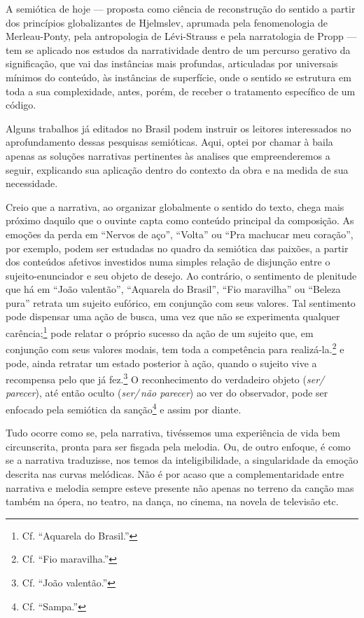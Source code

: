 A semiótica de hoje ---
proposta como ciência de reconstrução do sentido a partir dos princípios
globalizantes de Hjelmslev, aprumada pela fenomenologia de
Merleau-Ponty, pela antropologia de Lévi-Strauss e pela narratologia de
Propp --- tem se aplicado nos estudos da narratividade dentro de um
percurso gerativo da significação, que vai das instâncias mais profundas, articuladas por universais mínimos do conteúdo, às instâncias de
superfície, onde o sentido se estrutura em toda a sua complexidade,
antes, porém, de receber o tratamento específico de um código.

Alguns trabalhos já editados no Brasil podem instruir os leitores
interessados no aprofundamento dessas pesquisas semióticas. Aqui,
optei por chamar à baila apenas as soluções narrativas pertinentes às
analises que empreenderemos a seguir, explicando sua aplicação dentro do
contexto da obra e na medida de sua necessidade.

Creio que a narrativa, ao organizar globalmente o sentido do texto,
chega mais próximo daquilo que o ouvinte capta como conteúdo principal
da composição. As emoções da perda em ``Nervos de aço'', ``Volta'' ou ``Pra
machucar meu coração'', por exemplo, podem ser estudadas no quadro da
semiótica das paixões, a partir dos conteúdos afetivos investidos numa
simples relação de disjunção entre o sujeito-enunciador e seu objeto de
desejo. Ao contrário, o sentimento de plenitude que há em ``João valentão'',
``Aquarela do Brasil'', ``Fio maravilha'' ou ``Beleza pura'' retrata um sujeito
eufórico, em conjunção com seus valores. Tal sentimento pode dispensar
uma ação de busca, uma vez que não se experimenta qualquer carência;\footnote{Cf. ``Aquarela do Brasil.''} pode relatar o próprio sucesso da ação de um
sujeito que, em conjunção com seus valores modais, tem toda a
competência para realizá-la.\footnote{Cf. ``Fio maravilha.''} e pode, ainda retratar
um estado posterior à ação, quando o sujeito vive a recompensa pelo que
já fez.\footnote{Cf. ``João valentão.''} O reconhecimento do verdadeiro objeto
(\textit{ser/\,parecer}), até então oculto (\textit{ser/\,não parecer}) ao ver do observador,
pode ser enfocado pela semiótica da sanção\footnote{Cf. ``Sampa.''} e assim por
diante.

Tudo ocorre como se, pela narrativa, tivéssemos uma experiência de vida
bem circunscrita, pronta para ser fisgada pela melodia. Ou, de outro
enfoque, é como se a narrativa traduzisse, nos temos da
inteligibilidade, a singularidade da emoção descrita nas curvas
melódicas. Não é por acaso que a complementaridade entre narrativa e
melodia sempre esteve presente não apenas no terreno da canção mas
também na ópera, no teatro, na dança, no cinema, na novela de televisão
etc.

